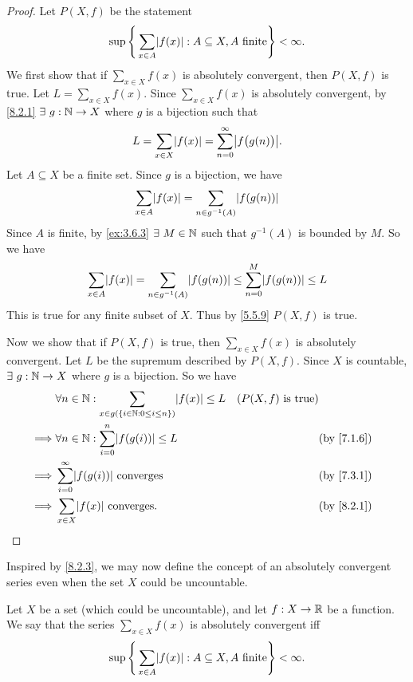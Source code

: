 \begin{proof}
  Let \(P(X, f)\) be the statement
  \[
    \sup\Bigg\{\sum_{x \in A} \abs{f(x)} : A \subseteq X, A \text{ finite}\Bigg\} < \infty.
  \]
  We first show that if \(\sum_{x \in X} f(x)\) is absolutely convergent, then \(P(X, f)\) is true.
  Let \(L = \sum_{x \in X} f(x)\).
  Since \(\sum_{x \in X} f(x)\) is absolutely convergent, by \cref{8.2.1} \(\exists\ g : \mathbb{N} \to X\) where \(g\) is a bijection such that
  \[
    L = \sum_{x \in X} \abs{f(x)} = \sum_{n = 0}^\infty \abs{f\big(g(n)\big)}.
  \]
  Let \(A \subseteq X\) be a finite set.
  Since \(g\) is a bijection, we have
  \[
    \sum_{x \in A} \abs{f(x)} = \sum_{n \in g^{-1}(A)} \abs{f(g(n))}
  \]
  Since \(A\) is finite, by \cref{ex:3.6.3} \(\exists\ M \in \mathbb{N}\) such that \(g^{-1}(A)\) is bounded by \(M\).
  So we have
  \[
    \sum_{x \in A} \abs{f(x)} = \sum_{n \in g^{-1}(A)} \abs{f(g(n))} \leq \sum_{n = 0}^M \abs{f(g(n))} \leq L
  \]
  This is true for any finite subset of \(X\).
  Thus by \cref{5.5.9} \(P(X, f)\) is true.

  Now we show that if \(P(X, f)\) is true, then \(\sum_{x \in X} f(x)\) is absolutely convergent.
  Let \(L\) be the supremum described by \(P(X, f)\).
  Since \(X\) is countable, \(\exists\ g : \mathbb{N} \to X\) where \(g\) is a bijection.
  So we have
  \begin{align*}
             & \forall n \in \N : \sum_{x \in g(\{i \in \N : 0 \leq i \leq n\})} \abs{f(x)} \leq L & (P(X, f) \text{ is true})                            \\
    \implies & \forall n \in \N : \sum_{i = 0}^n \abs{f(g(i))} \leq L                              &                           & \text{(by \cref{7.1.6})} \\
    \implies & \sum_{i = 0}^\infty \abs{f(g(i))} \text{ converges}                                 &                           & \text{(by \cref{7.3.1})} \\
    \implies & \sum_{x \in X} \abs{f(x)} \text{ converges}.                                        &                           & \text{(by \cref{8.2.1})}
  \end{align*}
\end{proof}

\begin{note}
  Inspired by \cref{8.2.3}, we may now define the concept of an absolutely convergent series even when the set \(X\) could be uncountable.
\end{note}

\begin{defn}\label{8.2.4}
  Let \(X\) be a set (which could be uncountable), and let \(f : X \to \mathbb{R}\) be a function.
  We say that the series \(\sum_{x \in X} f(x)\) is absolutely convergent iff
  \[
    \sup\Bigg\{\sum_{x \in A} \abs{f(x)} : A \subseteq X, A \text{ finite}\Bigg\} < \infty.
  \]
\end{defn}

